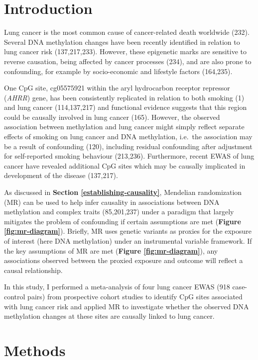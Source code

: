 \documentclass[11pt,twoside]{bristolthesis}
\begin{document}
\hypertarget{introduction-07}{%
\section{Introduction}\label{introduction-07}}

Lung cancer is the most common cause of cancer-related death worldwide (232). Several DNA methylation changes have been recently identified in relation to lung cancer risk (137,217,233). However, these epigenetic marks are sensitive to reverse causation, being affected by cancer processes (234), and are also prone to confounding, for example by socio-economic and lifestyle factors (164,235).

One CpG site, cg05575921 within the aryl hydrocarbon receptor repressor (\emph{AHRR}) gene, has been consistently replicated in relation to both smoking (1) and lung cancer (114,137,217) and functional evidence suggests that this region could be causally involved in lung cancer (165). However, the observed association between methylation and lung cancer might simply reflect separate effects of smoking on lung cancer and DNA methylation, i.e.~the association may be a result of confounding (120), including residual confounding after adjustment for self-reported smoking behaviour (213,236). Furthermore, recent EWAS of lung cancer have revealed additional CpG sites which may be causally implicated in development of the disease (137,217).

As discussed in \textbf{Section \ref{establishing-causality}}, Mendelian randomization (MR) can be used to help infer causality in associations between DNA methylation and complex traits (85,201,237) under a paradigm that largely mitigates the problem of confounding if certain assumptions are met (\textbf{Figure \ref{fig:mr-diagram}}). Briefly, MR uses genetic variants as proxies for the exposure of interest (here DNA methylation) under an instrumental variable framework. If the key assumptions of MR are met (\textbf{Figure \ref{fig:mr-diagram}}), any associations observed between the proxied exposure and outcome will reflect a causal relationship.

In this study, I performed a meta-analysis of four lung cancer EWAS (918 case-control pairs) from prospective cohort studies to identify CpG sites associated with lung cancer risk and applied MR to investigate whether the observed DNA methylation changes at these sites are causally linked to lung cancer.

\hypertarget{methods-07}{%
\section{Methods}\label{methods-07}}
\end{document}
